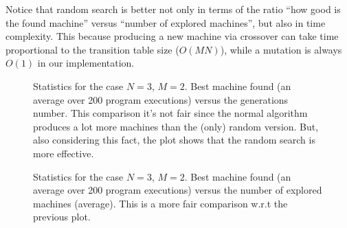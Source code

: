 \documentclass{report}
\begin{document}
Notice that random search is better not only in terms of the ratio ``how good is the found machine'' versus ``number of explored machines'', but also in time complexity. This because producing a new machine via crossover can take time proportional to the transition table size (\ie $O(MN)$), while a mutation is always $O(1)$ in our implementation.

\begin{figure}[t]
\centering
{}
\caption[]{Statistics for the case $N=3$, $M=2$. Best machine found (an average over 200 program executions) versus the generations number. This comparison it's not fair since the normal algorithm produces a lot more machines than the (only) random version. But, also considering this fact, the plot shows that the random search is more effective.}
\label{plot32}
\end{figure}


\begin{figure}[t]
\centering
{}
\caption[]{Statistics for the case $N=3$, $M=2$. Best machine found (an average over 200 program executions) versus the number of explored machines (average). This is a more fair comparison w.r.t the previous plot.}
\label{plot32good}
\end{figure}
\end{document}
